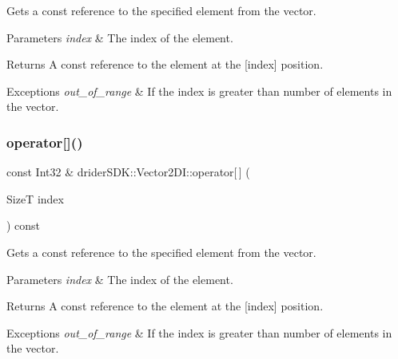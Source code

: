 Gets a const reference to the specified element from the vector.


\begin{DoxyParams}{Parameters}
{\em index} & The index of the element.\\
\hline
\end{DoxyParams}
\begin{DoxyReturn}{Returns}
A const reference to the element at the \mbox{[}index\mbox{]} position.
\end{DoxyReturn}

\begin{DoxyExceptions}{Exceptions}
{\em out\+\_\+of\+\_\+range} & If the index is greater than number of elements in the vector. \\
\hline
\end{DoxyExceptions}
\mbox{\label{classdrider_s_d_k_1_1_vector2_d_i_ad842c5082bbdfbc017fcfac8240197bb}} 
\subsubsection{\texorpdfstring{operator[]()}{operator[]()}\hspace{0.1cm}{\footnotesize\ttfamily [2/2]}}
{\footnotesize\ttfamily const Int32 \& drider\+S\+D\+K\+::\+Vector2\+D\+I\+::operator\mbox{[}$\,$\mbox{]} (\begin{DoxyParamCaption}\item[{SizeT}]{index }\end{DoxyParamCaption}) const}

Gets a const reference to the specified element from the vector.


\begin{DoxyParams}{Parameters}
{\em index} & The index of the element.\\
\hline
\end{DoxyParams}
\begin{DoxyReturn}{Returns}
A const reference to the element at the \mbox{[}index\mbox{]} position.
\end{DoxyReturn}

\begin{DoxyExceptions}{Exceptions}
{\em out\+\_\+of\+\_\+range} & If the index is greater than number of elements in the vector. \\
\hline
\end{DoxyExceptions}
\mbox{\label{classdrider_s_d_k_1_1_vector2_d_i_a9a101d51a408b48cbc846073b54bf30e}} 
